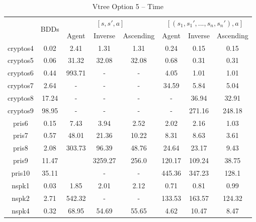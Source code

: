 \documentclass[11pt]{report}
\begin{document}
\begin{table}
\centering
\begin{tabular}{|*{8}{c|}}
\hline
& \multirow{2}{*}{BDDs} & \multicolumn{3}{c|}{$[s, s', a]$}& \multicolumn{3}{c|}{$[(s_1, s_1', ..., s_n, s_n'), a]$}\\ \cline{3-8}
& & Agent & Inverse & Ascending & Agent & Inverse &  Ascending \\ \hline
cryptos4 & 0.02 & 2.41 & 1.31 & 1.31& 0.24 & 0.15 & 0.15 \\ \hline
cryptos5 & 0.06 & 31.32 & 32.08 & 32.08&0.68& 0.31 & 0.31 \\ \hline
cryptos6 & 0.44 & 993.71& - & - & 4.05 & 1.01 & 1.01 \\ \hline
cryptos7 & 2.64 & - & - & - & 34.59 & 5.84 & 5.04\\ \hline
cryptos8 & 17.24 & - & - & - & - & 36.94 & 32.91 \\ \hline
cryptos9 & 98.95 & - & - & - & - & 271.16 & 248.18\\ \hline
pris6 & 0.15 & 7.43 & 3.94 & 2.52 & 2.02 & 2.16 & 1.03 \\ \hline
pris7 & 0.57 & 48.01 & 21.36 & 10.22& 8.31 & 8.63 & 3.61 \\ \hline
pris8 & 2.08 & 303.73 & 96.39 & 48.76 & 24.64 & 23.17 & 9.43 \\ \hline
pris9 & 11.47 &  & 3259.27 & 256.0 & 120.17& 109.24 & 38.75 \\ \hline
pris10 & 35.11 &  & - & - & 445.36& 347.23 & 128.1\\ \hline
nspk1 & 0.03 & 1.85 & 2.01 & 2.12 & 0.71 &0.81&  0.99\\ \hline
nspk2 & 2.71 & 542.32& - & - & 133.53 & 163.57 &  124.32\\ \hline
nspk4 & 0.32 & 68.95 &54.69 & 55.65 & 4.62 & 10.47 & 8.47\\ \hline
\end{tabular}
\caption{Vtree Option 5 -- Time}
\label{table:vtree5time}
\end{table}
\end{document}
